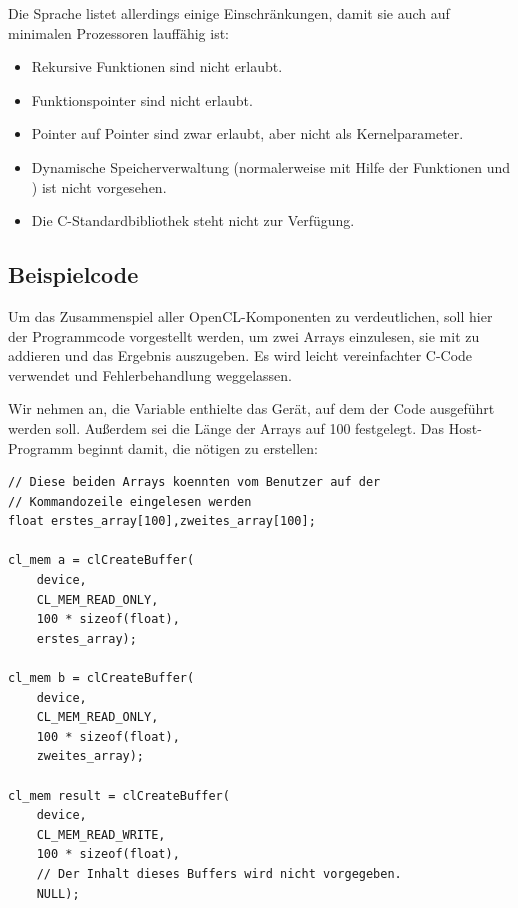 Die Sprache listet allerdings einige Einschränkungen, damit sie auch
auf minimalen Prozessoren lauffähig ist:

\begin{itemize}
\item Rekursive Funktionen sind nicht erlaubt.
\item Funktionspointer sind nicht erlaubt.
\item Pointer auf Pointer sind zwar erlaubt, aber nicht als Kernelparameter.
\item Dynamische Speicherverwaltung (normalerweise mit Hilfe der Funktionen  und ) ist nicht vorgesehen.
\item Die C-Standardbibliothek steht nicht zur Verfügung.
\end{itemize}

\subsection{Beispielcode}

Um das Zusammenspiel aller OpenCL-Komponenten zu verdeutlichen, soll
hier der Programmcode vorgestellt werden, um zwei Arrays einzulesen,
sie mit  zu addieren
und das Ergebnis auszugeben. Es wird leicht vereinfachter C-Code
verwendet und \PimiddyzB Fehlerbehandlung weggelassen.

Wir nehmen an, die Variable  enthielte das
Gerät, auf dem der Code ausgeführt werden soll. Außerdem sei die Länge
der Arrays auf 100 festgelegt. Das Host-Programm beginnt damit, die
nötigen  zu erstellen:

\begin{verbatim}
// Diese beiden Arrays koennten vom Benutzer auf der
// Kommandozeile eingelesen werden
float erstes_array[100],zweites_array[100];

cl_mem a = clCreateBuffer(
    device,
    CL_MEM_READ_ONLY,
    100 * sizeof(float),
    erstes_array);

cl_mem b = clCreateBuffer(
    device,
    CL_MEM_READ_ONLY,
    100 * sizeof(float),
    zweites_array);

cl_mem result = clCreateBuffer(
    device,
    CL_MEM_READ_WRITE,
    100 * sizeof(float),
    // Der Inhalt dieses Buffers wird nicht vorgegeben.
    NULL);
\end{verbatim}

